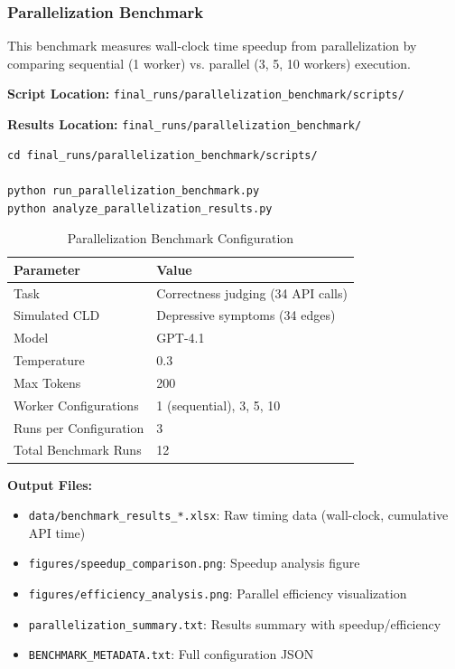 \subsubsection{Parallelization Benchmark}

This benchmark measures wall-clock time speedup from parallelization by comparing sequential (1 worker) vs. parallel (3, 5, 10 workers) execution.

\textbf{Script Location:} \texttt{final\_runs/parallelization\_benchmark/scripts/}

\textbf{Results Location:} \texttt{final\_runs/parallelization\_benchmark/}

\begin{verbatim}
cd final_runs/parallelization_benchmark/scripts/

python run_parallelization_benchmark.py
python analyze_parallelization_results.py
\end{verbatim}

\begin{table}[H]
\centering
\caption{Parallelization Benchmark Configuration}
\label{tab:parallel_benchmark_config}
\footnotesize
\begin{tabular}{@{}ll@{}}
\toprule
\textbf{Parameter} & \textbf{Value} \\
\midrule
Task & Correctness judging (34 API calls) \\
Simulated CLD & Depressive symptoms (34 edges) \\
Model & GPT-4.1 \\
Temperature & 0.3 \\
Max Tokens & 200 \\
Worker Configurations & 1 (sequential), 3, 5, 10 \\
Runs per Configuration & 3 \\
Total Benchmark Runs & 12 \\
\bottomrule
\end{tabular}
\end{table}

\textbf{Output Files:}
\begin{itemize}[noitemsep]
    \item \texttt{data/benchmark\_results\_*.xlsx}: Raw timing data (wall-clock, cumulative API time)
    \item \texttt{figures/speedup\_comparison.png}: Speedup analysis figure
    \item \texttt{figures/efficiency\_analysis.png}: Parallel efficiency visualization
    \item \texttt{parallelization\_summary.txt}: Results summary with speedup/efficiency
    \item \texttt{BENCHMARK\_METADATA.txt}: Full configuration JSON
\end{itemize}


